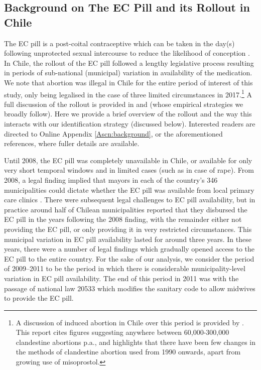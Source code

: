 \documentclass[12pt]{article}
\begin{document}
\begin{spacing}{1.9}
\section{Background on The EC Pill and its Rollout in Chile}
\label{scn:background}
The EC pill is a post-coital contraceptive which can be taken in the day(s) following unprotected sexual intercourse to reduce the likelihood of conception \citep{vonHertzenetal2002}. In Chile, the rollout of the EC pill followed a lengthy legislative process resulting in periods of sub-national (municipal) variation in availability of the medication. We note that abortion was illegal in Chile for the entire period of interest of this study, only being legalised in the case of three limited circumstances in 2017.\footnote{A discussion of induced abortion in Chile over this period is provided by \citet{PradaBall2016}. This report cites figures suggesting anywhere between 60,000-300,000 clandestine abortions p.a., and highlights that there have been few changes in the methods of clandestine abortion used from 1990 onwards, apart from growing use of misoprostol.}  A full discussion of the rollout is provided in \citet{CasasBecerra2008} and \citet{NuevoChiqueroPino2019,BentancorClarke2017} (whose empirical strategies we broadly follow).  Here we provide a brief overview of the rollout and the way this interacts with our identification strategy (discussed below).  Interested readers are directed to Online Appendix \ref{Ascn:background}, or the aforementioned references, where fuller details are available.

Until 2008, the EC pill was completely unavailable in Chile, or available for only very short temporal windows and in limited cases (such as in case of rape).  From 2008, a legal finding implied that mayors in each of the country's 346 municipalities could dictate whether the EC pill was available from local primary care clinics \citep{Didesetal2009,Didesetal2010,Didesetal2011}.  There were subsequent legal challenges to EC pill availability, but in practice around half of Chilean municipalities reported that they disbursed the EC pill in the years following the 2008 finding, with the remainder either not providing the EC pill, or only providing it in very restricted circumstances.  This municipal variation in EC pill availability lasted for around three years.  In these years, there were a number of legal findings which gradually opened access to the EC pill to the entire country. For the sake of our analysis, we consider the period of 2009--2011 to be the period in which there is considerable municipality-level variation in EC pill availability.  The end of this period in 2011 was with the passage of national law 20533 which modifies the sanitary code to allow midwives to provide the EC pill.


\end{spacing}
\end{document}
